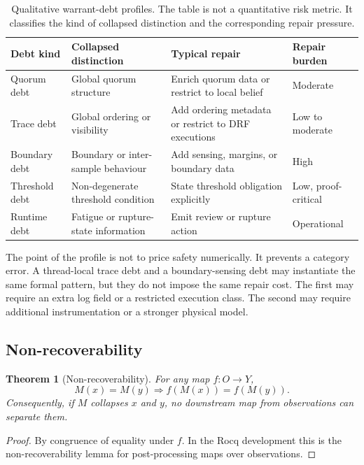 \documentclass[a4paper,11pt]{article}
\newtheorem{theorem}{Theorem}[section]
\begin{document}
\begin{table}[t]
\centering
\small
\begin{tabular}{p{1.9cm}p{2.5cm}p{4.2cm}p{2.0cm}}
\hline
Debt kind & Collapsed distinction & Typical repair & Repair burden \\
\hline
Quorum debt
  & Global quorum structure
  & Enrich quorum data or restrict to local belief
  & Moderate \\[4pt]
Trace debt
  & Global ordering or visibility
  & Add ordering metadata or restrict to DRF executions
  & Low to moderate \\[4pt]
Boundary debt
  & Boundary or inter-sample behaviour
  & Add sensing, margins, or boundary data
  & High \\[4pt]
Threshold debt
  & Non-degenerate threshold condition
  & State threshold obligation explicitly
  & Low, proof-critical \\[4pt]
Runtime debt
  & Fatigue or rupture-state information
  & Emit review or rupture action
  & Operational \\
\hline
\end{tabular}
\caption{Qualitative warrant-debt profiles.  The table is not a quantitative
risk metric.  It classifies the kind of collapsed distinction and the
corresponding repair pressure.}
\label{tab:warrant-debt-profiles}
\end{table}

The point of the profile is not to price safety numerically.  It prevents a
category error.  A thread-local trace debt and a boundary-sensing debt may
instantiate the same formal pattern, but they do not impose the same repair
cost.  The first may require an extra log field or a restricted execution
class.  The second may require additional instrumentation or a stronger
physical model.

\subsection{Non-recoverability}

\begin{theorem}[Non-recoverability]
\label{thm:no-recovery}
For any map \(f : O \to Y\),
\[
  M(x) = M(y) \Longrightarrow f(M(x)) = f(M(y)).
\]
Consequently, if \(M\) collapses \(x\) and \(y\), no downstream map from
observations can separate them.
\end{theorem}

\begin{proof}
By congruence of equality under \(f\). In the Rocq development this is the
non-recoverability lemma for post-processing maps over observations.
\end{proof}
\end{document}
